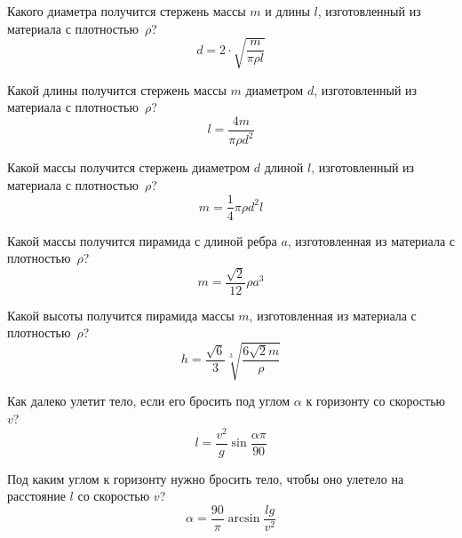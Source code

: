 
\begin{zztask}
Какого диаметра получится стержень массы $m$ и длины $l$, изготовленный из
материала с плотностью~$\rho$?
%
\[
d = 2\cdot \sqrt{\frac{m}{\pi\rho l}}
\]
\end{zztask}


\begin{zztask}
Какой длины получится стержень массы $m$ диаметром $d$, изготовленный из
материала с плотностью~$\rho$?
%
\[
l = \frac{4m}{\pi\rho d^2}
\]
\end{zztask}


\begin{zztask}
Какой массы получится стержень диаметром $d$ длиной $l$, изготовленный из
материала с плотностью~$\rho$?
%
\[
m = \frac{1}{4}\pi\rho d^2 l
\]
\end{zztask}


\begin{zztask}
Какой массы получится пирамида с длиной ребра $a$, изготовленная из
материала с плотностью~$\rho$?
%
\[
m = \frac{\sqrt2}{12}\rho a^3
\]
\end{zztask}


\begin{zztask}
Какой высоты получится пирамида массы $m$, изготовленная из
материала с плотностью~$\rho$?
%
\[
h = \frac{\sqrt6}{3} \sqrt[3]{\frac{6\sqrt2 m}{\rho}}
\]
\end{zztask}


\begin{zztask}
Как далеко улетит тело, если его бросить под углом $\alpha$ к горизонту
со скоростью $v$?
%
\[
l = \frac{v^2}{g}\sin\frac{\alpha\pi}{90}
\]
\end{zztask}


\begin{zztask}
Под каким углом к горизонту нужно бросить тело, чтобы оно улетело на
расстояние $l$ со скоростью $v$?
%
\[
\alpha = \frac{90}{\pi}\arcsin\frac{lg}{v^2}
\]
\end{zztask}

